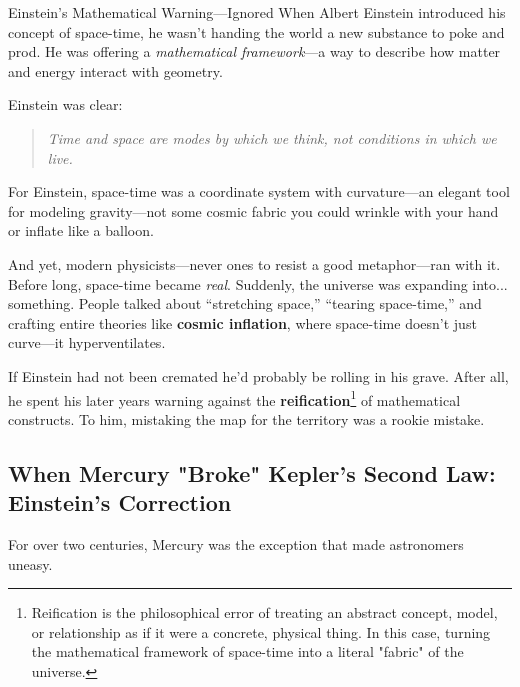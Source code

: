 \begin{HistoricalSidebar}{Einstein’s Mathematical Warning—Ignored}
  When Albert Einstein introduced his concept of space-time, he wasn’t handing the world a new substance to poke and prod. He was offering a \textit{mathematical framework}—a way to describe how matter and energy interact with geometry. 

  \medskip
  
  Einstein was clear:  

  \medskip

  \begin{quote}
  \textit{Time and space are modes by which we think, not conditions in which we live.}
  \end{quote}

  \medskip
  
  For Einstein, space-time was a coordinate system with curvature—an elegant tool for modeling gravity—not some cosmic fabric you could wrinkle with your hand or inflate like a balloon.

  \medskip
  
  And yet, modern physicists—never ones to resist a good metaphor—ran with it. Before long, space-time became \textit{real}. Suddenly, the universe was expanding into... something. People talked about “stretching space,” “tearing space-time,” and crafting entire theories like \textbf{cosmic inflation}, where space-time doesn’t just curve—it hyperventilates.

  \medskip
  
  If Einstein had not been cremated he'd probably be rolling in his grave. After all, he spent his later years warning against the \textbf{reification}\footnote{Reification is the philosophical error of treating an abstract concept, model, or relationship as if it were a concrete, physical thing. In this case, turning the mathematical framework of space-time into a literal "fabric" of the universe.} of mathematical constructs. To him, mistaking the map for the territory was a rookie mistake.

\end{HistoricalSidebar}





\subsection{When Mercury "Broke" Kepler’s Second Law: Einstein’s Correction}

For over two centuries, Mercury was the exception that made astronomers uneasy.

